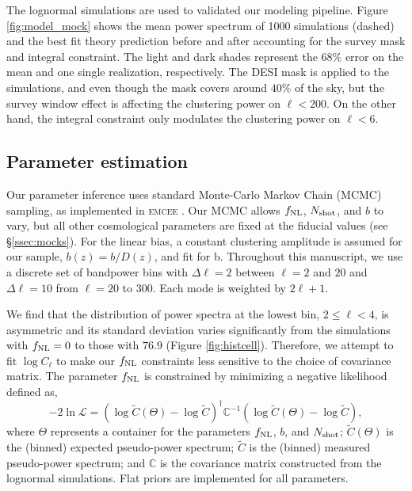 The lognormal simulations are used to validated our modeling pipeline. Figure \ref{fig:model_mock} shows the mean power spectrum of 1000 simulations (dashed) and the best fit theory prediction before and after accounting for the survey mask and integral constraint. The light and dark shades represent the 68\% error on the mean and one single realization, respectively. The DESI mask is applied to the simulations, and even though the mask covers around $40\%$ of the sky, but the survey window effect is affecting the clustering power on $\ell < 200$. On the other hand, the integral constraint only modulates the clustering power on $\ell < 6$.

\subsection{Parameter estimation}
Our parameter inference uses standard Monte-Carlo Markov Chain (MCMC) sampling, as implemented in \textsc{emcee} \citep{2013PASP..125..306F}. Our MCMC allows $f_{\rm NL}$, $N_{\rm shot}$, and $b$ to vary, but all other cosmological parameters are fixed at the fiducial values (see \S \ref{ssec:mocks}). For the linear bias, a constant clustering amplitude is assumed for our sample, $b(z) = b/D(z)$, and fit for b. Throughout this manuscript, we use a discrete set of bandpower bins with $\Delta\ell=2$ between $\ell=2$ and $20$ and $\Delta \ell=10$ from $\ell=20$ to $300$. Each mode is weighted by $2\ell+1$. 

We find that the distribution of power spectra at the lowest bin, $2\leq \ell < 4$, is asymmetric and its standard deviation varies significantly from the simulations with $f_{\rm NL}=0$ to those with $76.9$ (Figure \ref{fig:histcell}). Therefore, we attempt to fit $\log C_{\ell}$ to make our $f_{\rm NL}$ constraints less sensitive to the choice of covariance matrix. The parameter $f_{\rm NL}$ is constrained by minimizing a negative likelihood defined as,
\begin{equation}
-2\ln\mathcal{L} = (\log \tilde{C}(\Theta)-\log \tilde{C})^{\dagger} \mathbb{C}^{-1} (\log \tilde{C}(\Theta)-\log \tilde{C}),
\end{equation}
where $\Theta$ represents a container for the parameters $f_{\rm NL}$, $b$, and $N_{\rm shot}$; $\tilde{C}(\Theta)$ is the (binned) expected pseudo-power spectrum; $\tilde{C}$ is the (binned) measured pseudo-power spectrum; and $\mathbb{C}$ is the covariance matrix constructed from the lognormal simulations. Flat priors are implemented for all parameters.

